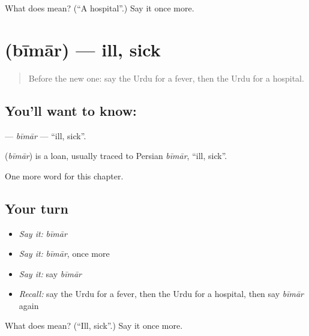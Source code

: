 \begin{tcolorbox}[breakable,colback=teal!4,colframe=teal!35!black,title={Before you move on}]
What does  mean? (\textquotedblleft{}A hospital\textquotedblright{}.) Say it once more.
\end{tcolorbox}
\section[\texorpdfstring{\ur{بیمار} (bīmār)}{بیمار (bīmār)}]{ (bīmār) — ill, sick}

\label{lesson:UR-C41-bimar}



\begin{quote}
Before the new one: say the Urdu for a fever, then the Urdu for a hospital.
\end{quote}

\subsection*{You'll want to know: }
\textbf{} — \emph{bīmār} — \textquotedblleft{}ill, sick\textquotedblright{}.

\begin{cousinweb}
\textbf{} (\emph{bīmār}) is a loan, usually traced to Persian \emph{bīmār}, \textquotedblleft{}ill, sick\textquotedblright{}.
\end{cousinweb}

\begin{grammarlens}[title={What you've built}]
One more word for this chapter.
\end{grammarlens}

\subsection*{Your turn}
\begin{itemize}
\raggedright
  \item \emph{Say it:} \emph{bīmār}
  \item \emph{Say it:} \emph{bīmār}, once more
  \item \emph{Say it:} say \emph{bīmār}
  \item \emph{Recall:} say the Urdu for a fever, then the Urdu for a hospital, then say \emph{bīmār} again
\end{itemize}

\begin{tcolorbox}[breakable,colback=teal!4,colframe=teal!35!black,title={Before you move on}]
What does  mean? (\textquotedblleft{}Ill, sick\textquotedblright{}.) Say it once more.
\end{tcolorbox}
